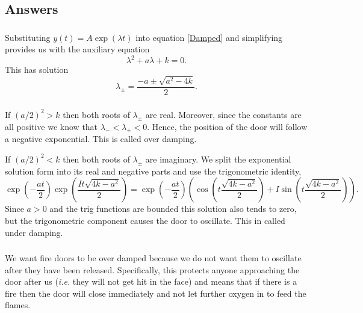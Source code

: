 \documentclass[10pt]{article}
\newcommand{\bb}{\begin{equation}}
\newcommand{\ee}{\end{equation}}
\newcommand{\eqn}[1]{equation \eqref{#1}}
\newcommand{\ie}{\emph{i.e.} }
\renewcommand{\l}{\left(}
\renewcommand{\r}{\right)}
\begin{document}
\begin{Answ}
\subsection{Answers}
\subsubsection{}
Substituting $y(t)=A\exp(\lambda t)$ into \eqn{Damped} and simplifying provides us with the auxiliary equation
\bb
\lambda^2+a\lambda+k=0.
\ee
This has solution
\bb
\lambda_\pm=\frac{-a\pm\sqrt{a^2-4k}}{2}.
\ee
\subsubsection{}
If $\l a/2\r^2>k$ then both roots of $\lambda_\pm$ are real. Moreover, since the constants are all positive we know that $\lambda_-<\lambda_+<0$. Hence, the position of the door will follow a negative exponential. This is called over damping.

If $\l a/2\r^2<k$ then both roots of $\lambda_\pm$ are imaginary. We split the exponential solution form into its real and negative parts and use the trigonometric identity,
\bb
\exp\l-\frac{at}{2}\r\exp\l\frac{It\sqrt{4k-a^2}}{2}\r=\exp\l-\frac{at}{2}\r\l\cos\l t\frac{\sqrt{4k-a^2}}{2}\r+I\sin\l t\frac{\sqrt{4k-a^2}}{2}\r\r.
\ee
Since $a>0$ and the trig functions are bounded this solution also tends to zero, but the trigonometric component causes the door to oscillate. This in called under damping.

\subsubsection{}
We want fire doors to be over damped because we do not want them to oscillate after they have been released. Specifically, this protects anyone approaching the door after us (\ie they will not get hit in the face) and means that if there is a fire then the door will close immediately and not let further oxygen in to feed the flames.
\end{Answ}
\end{document}

